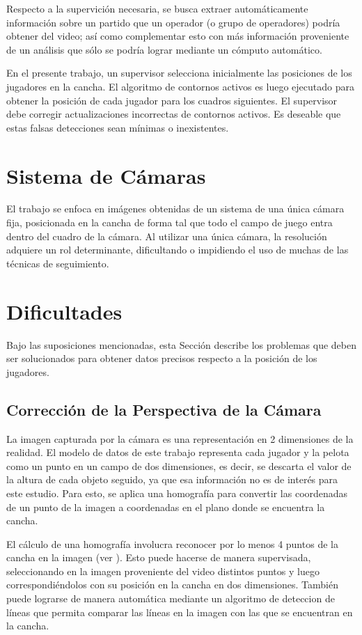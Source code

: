Respecto a la supervición necesaria, se busca extraer automáticamente
información sobre un partido que un operador (o grupo de operadores) podría
obtener del video; así como complementar esto con más información proveniente
de un análisis que sólo se podría lograr mediante un cómputo automático.

En el presente trabajo, un supervisor selecciona inicialmente las posiciones
de los jugadores en la cancha. El algoritmo de contornos activos es luego
ejecutado para obtener la posición de cada jugador para los cuadros siguientes.
El supervisor debe corregir actualizaciones incorrectas de contornos activos.
Es deseable que estas falsas detecciones sean mínimas o inexistentes.

\section{Sistema de Cámaras}

El trabajo se enfoca en imágenes obtenidas de un sistema de una única cámara
fija, posicionada en la cancha de forma tal que todo el campo de juego entra
dentro del cuadro de la cámara. Al utilizar una única cámara, la resolución
adquiere un rol determinante, dificultando o impidiendo el uso de muchas de las
técnicas de seguimiento.

\section{Dificultades}

Bajo las suposiciones mencionadas, esta Sección describe los problemas que
deben ser solucionados para obtener datos precisos respecto a la posición
de los jugadores.

\subsection{Corrección de la Perspectiva de la Cámara}

La imagen capturada por la cámara es una representación en 2 dimensiones de la
realidad. El modelo de datos de este trabajo representa cada jugador y la
pelota como un punto en un campo de dos dimensiones, es decir, se descarta el
valor de la altura de cada objeto seguido, ya que esa información no es de
interés para este estudio. Para esto, se aplica una homografía para convertir
las coordenadas de un punto de la imagen a coordenadas en el plano donde se
encuentra la cancha.

El cálculo de una homografía involucra reconocer por lo menos 4 puntos de la
cancha en la imagen (ver \cite{homography-estimation}). Esto puede hacerse de
manera supervisada, seleccionando en la imagen proveniente del video distintos
puntos y luego correspondiéndolos con su posición en la cancha en dos
dimensiones. También puede lograrse de manera automática mediante un algoritmo
de deteccion de líneas que permita comparar las líneas en la imagen con las que
se encuentran en la cancha.

